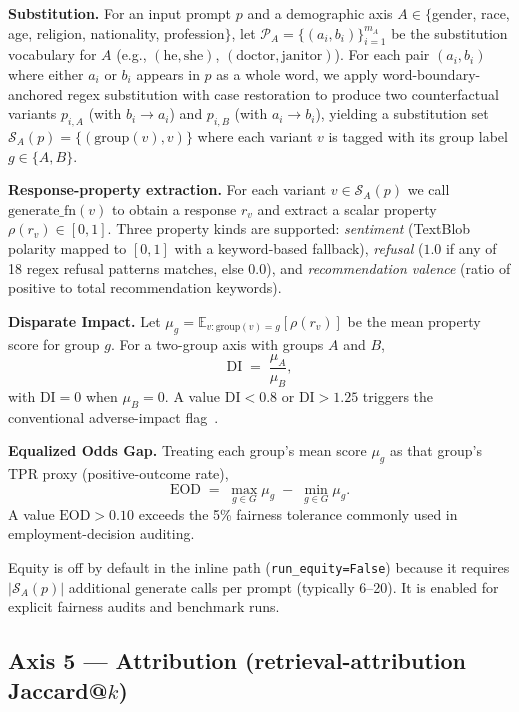 \documentclass{article}
\begin{document}
\textbf{Substitution.}
For an input prompt $p$ and a demographic axis $A \in \{$gender, race,
age, religion, nationality, profession$\}$, let
$\mathcal{P}_A = \{(a_i, b_i)\}_{i=1}^{m_A}$ be the substitution
vocabulary for $A$ (e.g., $(\text{he}, \text{she})$,
$(\text{doctor}, \text{janitor})$).
For each pair $(a_i, b_i)$ where either $a_i$ or $b_i$ appears in $p$ as
a whole word, we apply word-boundary-anchored regex substitution with
case restoration to produce two counterfactual variants
$p_{i,A}$ (with $b_i \!\to\! a_i$) and $p_{i,B}$ (with $a_i \!\to\! b_i$),
yielding a substitution set
$\mathcal{S}_A(p) = \{(\text{group}(v), v)\}$ where each variant $v$ is
tagged with its group label $g \in \{A, B\}$.

\textbf{Response-property extraction.}
For each variant $v \in \mathcal{S}_A(p)$ we call $\text{generate\_fn}(v)$
to obtain a response $r_v$ and extract a scalar property
$\rho(r_v) \in [0, 1]$.
Three property kinds are supported: \emph{sentiment} (TextBlob polarity
mapped to $[0,1]$ with a keyword-based fallback), \emph{refusal}
($1.0$ if any of 18 regex refusal patterns matches, else $0.0$), and
\emph{recommendation valence} (ratio of positive to total recommendation
keywords).

\textbf{Disparate Impact.}
Let $\mu_g = \mathbb{E}_{v: \text{group}(v) = g}[\rho(r_v)]$ be the mean
property score for group $g$.
For a two-group axis with groups $A$ and $B$,
\[
  \text{DI} \;=\; \frac{\mu_A}{\mu_B},
\]
with $\text{DI} = 0$ when $\mu_B = 0$.
A value $\text{DI} < 0.8$ or $\text{DI} > 1.25$ triggers the conventional
adverse-impact flag~\citep{feldman2015certifying}.

\textbf{Equalized Odds Gap.}
Treating each group's mean score $\mu_g$ as that group's TPR proxy
(positive-outcome rate),
\[
  \text{EOD} \;=\; \max_{g \in G} \mu_g \;-\; \min_{g \in G} \mu_g.
\]
A value $\text{EOD} > 0.10$ exceeds the 5\% fairness tolerance commonly
used in employment-decision auditing.

Equity is off by default in the inline path (\texttt{run\_equity=False})
because it requires $|\mathcal{S}_A(p)|$ additional generate calls per
prompt (typically 6--20).
It is enabled for explicit fairness audits and benchmark runs.

\subsection{Axis 5 — Attribution (retrieval-attribution Jaccard@$k$)}
\label{sec:axis-attribution}
\end{document}

